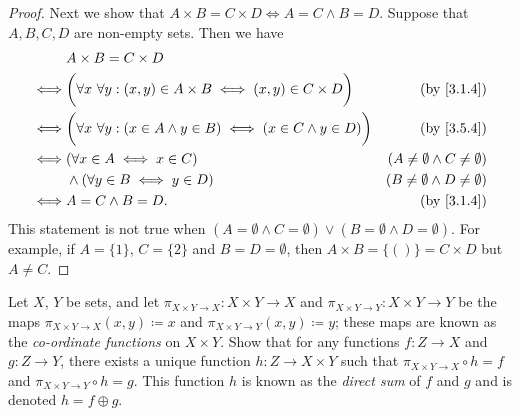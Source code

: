 \begin{proof}
  Next we show that \(A \times B = C \times D \iff A = C \land B = D\).
  Suppose that \(A, B, C, D\) are non-empty sets.
  Then we have
  \begin{align*}
         & A \times B = C \times D                                                                                                              \\
    \iff & \bigg(\forall x \ \forall y : (x, y) \in A \times B \iff (x, y) \in C \times D\bigg)     & \text{(by \cref{3.1.4})}                  \\
    \iff & \bigg(\forall x \ \forall y : (x \in A \land y \in B) \iff (x \in C \land y \in D)\bigg) & \text{(by \cref{3.5.4})}                  \\
    \iff & (\forall x \in A \iff x \in C)                                                           & (A \neq \emptyset \land C \neq \emptyset) \\
         & \land (\forall y \in B \iff y \in D)                                                     & (B \neq \emptyset \land D \neq \emptyset) \\
    \iff & A = C \land B = D.                                                                       & \text{(by \cref{3.1.4})}
  \end{align*}
  This statement is not true when \((A = \emptyset \land C = \emptyset) \lor (B = \emptyset \land D = \emptyset)\).
  For example, if \(A = \{1\}\), \(C = \{2\}\) and \(B = D = \emptyset\), then \(A \times B = \{()\} = C \times D\) but \(A \neq C\).
\end{proof}

\begin{exercise}\label{ex 3.5.7}
  Let \(X\), \(Y\) be sets, and let \(\pi_{X \times Y \to X} : X \times Y \to X\) and \(\pi_{X \times Y \to Y} : X \times Y \to Y\) be the maps \(\pi_{X \times Y \to X}(x, y) \coloneqq x\) and \(\pi_{X \times Y \to Y}(x, y) \coloneqq y\);
  these maps are known as the \emph{co-ordinate functions} on \(X \times Y\).
  Show that for any functions \(f : Z \to X\) and \(g : Z \to Y\), there exists a unique function \(h : Z \to X \times Y\) such that \(\pi_{X \times Y \to X} \circ h = f\) and \(\pi_{X \times Y \to Y} \circ h = g\).
  This function \(h\) is known as the \emph{direct sum} of \(f\) and \(g\) and is denoted \(h = f \oplus g\).
\end{exercise}


